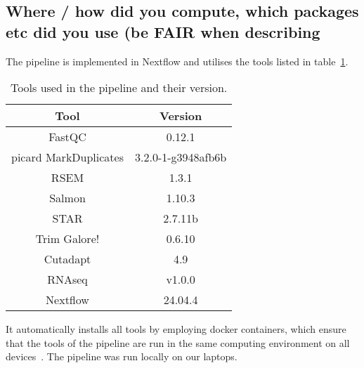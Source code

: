 \documentclass{article}
\theoremstyle{plain}
\theoremstyle{definition}
\theoremstyle{remark}
\begin{document}
\subsection{Where / how did you compute, which packages etc did you use (be FAIR when describing}
The pipeline is implemented in Nextflow and utilises the tools listed in table~\ref{table:1}.
\begin{table}[h]
    \centering
    \caption{Tools used in the pipeline and their version.}
    \label{table:1}
    \begin{tabular}{||c c||}
        \hline
        Tool & Version \\
        \hline\hline
        FastQC & 0.12.1\\
        picard MarkDuplicates & 3.2.0-1-g3948afb6b\\
        RSEM & 1.3.1\\
        Salmon & 1.10.3\\
        STAR & 2.7.11b\\
        Trim Galore! & 0.6.10\\
        Cutadapt & 4.9\\
        RNAseq & v1.0.0\\
        Nextflow & 24.04.4\\
        \hline
    \end{tabular}
\end{table}
It automatically installs all tools by employing docker containers, which ensure that the tools of the pipeline are run in the same computing environment on all devices~\cite{docker}.
The pipeline was run locally on our laptops.
\end{document}
